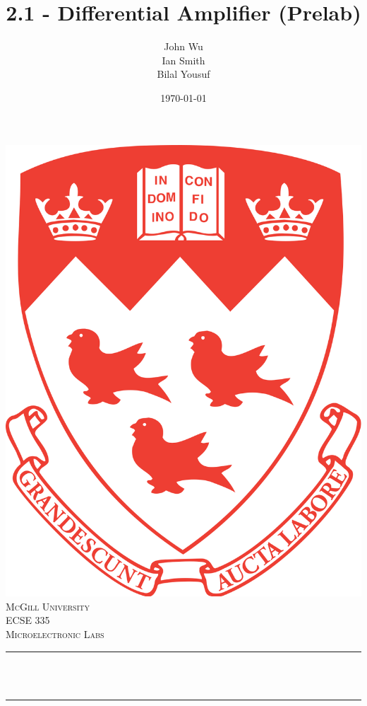 \documentclass[12pt]{article}
\title{2.1 - Differential Amplifier (Prelab)}                             %
\author{John Wu \\ Ian Smith \\ Bilal Yousuf}                               %
\date{\today}                                                           %
\makeatletter
\let\thetitle\@title
\makeatother
\begin{document}

\begin{titlepage}
    \centering
    \vspace*{0.5 cm}
    \includegraphics[scale = 0.07]{mcgill-logo.png}\\[1.0 cm]   %
    \textsc{\LARGE McGill University}\\[1.0 cm]   %
    \textsc{\Large ECSE 335}\\[0.5 cm]               %
    \textsc{\large Microelectronic Labs}\\[0.5 cm]               %
    \rule{\linewidth}{0.2 mm} \\[0.4 cm]
    { \huge \bfseries \thetitle}\\
    \rule{\linewidth}{0.2 mm} \\[1.5 cm]
    \begin{minipage}{0.4\textwidth}
        \begin{flushleft} \large

\end{flushleft}
\end{minipage}
\end{titlepage}
\end{document}
